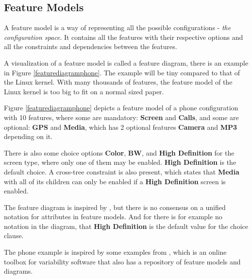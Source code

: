 \documentclass[a4paper,11pt]{report}
\begin{document}
            \subsection{Feature Models}

A feature model is a way of representing all the possible configurations - 
\emph{the configuration space}. It contains all the features with their 
respective options and all the constraints and dependencies between the features.

A visualization of a feature model is called a feature diagram, there is an 
example in Figure \ref{featurediagramphone}. The example will be tiny compared 
to that of the Linux kernel. With many thousands of features, the feature model 
of the Linux kernel is too big to fit on a normal sized paper.

Figure \ref{featurediagramphone} depicts a feature model of a phone 
configuration with 10 features, where some are mandatory: \textbf{Screen} and 
\textbf{Calls}, and some are optional: \textbf{GPS} and \textbf{Media}, which has 2
optional features \textbf{Camera} and \textbf{MP3} depending on it.

There is also some choice options \textbf{Color}, \textbf{BW}, and \textbf{High 
Definition} for the screen type, where only one of them may be enabled. 
\textbf{High Definition} is the default choice. A 
cross-tree constraint is also present, which states that \textbf{Media} with 
all of its children can only be enabled if a \textbf{High Definition} screen is 
enabled.

The feature diagram is inspired by \cite{AAFM}, but there is no consensus on a 
unified notation for attributes in feature models\cite{AAFM}. And for there is 
for example no notation in the diagram, that \textbf{High Definition} is the 
default value for the choice clause.

The phone example is inspired by some examples from \cite{SPLOT}, which is an 
online toolbox for variability software that also has a repository of feature 
models and diagrams.
\end{document}
